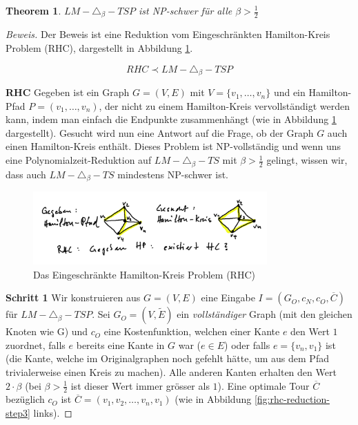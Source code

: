 \documentclass[a4paper,11pt]{scrreprt}
\begin{document}
\newtheorem{t2}{Theorem}

\begin{t2}
$LM-\triangle_\beta-TSP$ ist NP-schwer für alle $\beta > \frac{1}{2}$
\end{t2}

\begin{proof}[Beweis]
Der Beweis ist eine Reduktion vom Eingeschränkten Hamilton-Kreis Problem (RHC), dargestellt in Abbildung \ref{fig:rhc-reduction-step1}. 

\[ RHC \prec LM-\triangle_\beta-TSP \]

\textbf{RHC} Gegeben ist ein Graph $G = (V, E)$ mit $V = \{v_1, \dots, v_n\}$ und ein Hamilton-Pfad $P = (v_1, \dots, v_n)$, der nicht zu einem Hamilton-Kreis vervollständigt werden kann, indem man einfach die Endpunkte zusammenhängt (wie in Abbildung \ref{fig:rhc-reduction-step1} dargestellt). Gesucht wird nun eine Antwort auf die Frage, ob der Graph $G$ auch einen Hamilton-Kreis enthält. Dieses Problem ist NP-vollständig und wenn uns eine Polynomialzeit-Reduktion auf $LM-\triangle_\beta-TS$ mit $\beta > \frac{1}{2}$ gelingt, wissen wir, dass auch $LM-\triangle_\beta-TS$ mindestens NP-schwer ist.

\begin{figure}[H]
\centering
\includegraphics[width=0.8\textwidth]{rhc_reduction_step1.png}
\caption{Das Eingeschränkte Hamilton-Kreis Problem (RHC)}
\label{fig:rhc-reduction-step1}
\end{figure}

\textbf{Schritt 1} Wir konstruieren aus $G = (V, E)$ eine Eingabe $I = (G_O, c_N, c_O, \overline{C})$ für $LM-\triangle_\beta-TSP$. Sei $G_O = (V, \tilde{E})$ ein \emph{vollständiger} Graph (mit den gleichen Knoten wie G) und $c_O$ eine Kostenfunktion, welchen einer Kante $e$ den Wert $1$ zuordnet, falls $e$ bereits eine Kante in $G$ war ($e \in E$) oder falls $e = \{v_n, v_1\}$ ist (die Kante, welche im Originalgraphen noch gefehlt hätte, um aus dem Pfad trivialerweise einen Kreis zu machen). Alle anderen Kanten erhalten den Wert $2 \cdot \beta$ (bei $\beta > \frac{1}{2}$ ist dieser Wert immer grösser als $1$). Eine optimale Tour $\overline{C}$ bezüglich $c_O$ ist $\overline{C} = (v_1, v_2, \dots, v_n, v_1)$ (wie in Abbildung \ref{fig:rhc-reduction-step3} links).


\end{proof}
\end{document}
